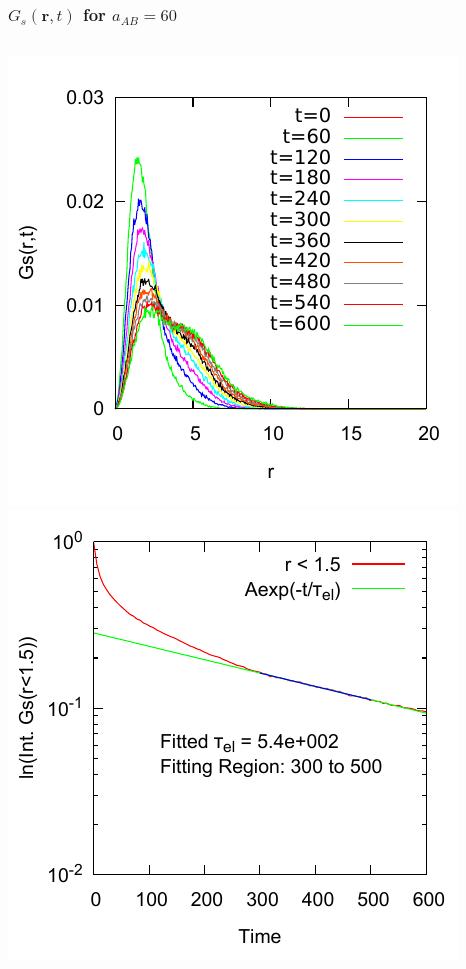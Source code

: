 \documentclass[12pt, dvipdfmx]{beamer}
\begin{document}
\begin{frame}
\frametitle{$G_s(\bm{r}, t)$ for $a_{AB}=60$}

\begin{columns}[T, totalwidth=\linewidth]
		\includegraphics[width=\columnwidth]{./fig/AB60/Ave_Trj.pdf}
		\includegraphics[width=\columnwidth]{./fig/AB60/Cuml_data_5.pdf}
\end{columns}

\end{frame}
\end{document}
